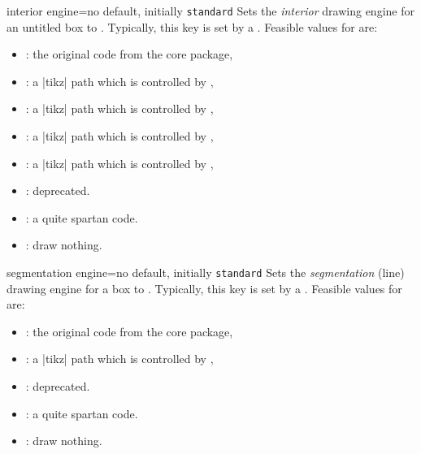 \clearpage
\begin{docTcbKey}{interior engine}{=}{no default, initially \texttt{standard}}
  Sets the \emph{interior} drawing engine for an untitled box to .
  Typically, this key is set by a .
  Feasible values for  are:
  \begin{itemize}
  \item{}: the original code from the core package,
  \item{}: a |tikz| path which is controlled by ,
  \item{}: a |tikz| path which is controlled by ,
  \item{}: a |tikz| path which is controlled by ,
  \item{}: a |tikz| path which is controlled by ,
  \item{}: deprecated.
  \item{}: a quite spartan code.
  \item{}: draw nothing.
  \end{itemize}
\end{docTcbKey}

\begin{docTcbKey}{segmentation engine}{=}{no default, initially \texttt{standard}}
  Sets the \emph{segmentation} (line) drawing engine for a box to .
  Typically, this key is set by a .
  Feasible values for  are:
  \begin{itemize}
  \item{}: the original code from the core package,
  \item{}: a |tikz| path which is controlled by ,
  \item{}: deprecated.
  \item{}: a quite spartan code.
  \item{}: draw nothing.
  \end{itemize}
\end{docTcbKey}

